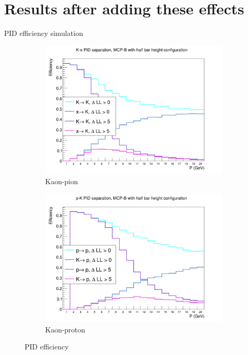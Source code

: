 \documentclass{beamer}
\begin{document}
\section{Results after adding these effects}
\begin{frame}{PID efficiency simulation}
  \begin{figure}
    \centering
    \vspace{-0.2cm}
    \begin{subfigure}{0.5\textwidth}
      \includegraphics[width = 1.0\textwidth]{Plots/KaonPionPIDEfficiencyMCPB_Backscattering.png}
      \caption{Kaon-pion}
    \end{subfigure}%
    \begin{subfigure}{0.5\textwidth}
      \includegraphics[width = 1.0\textwidth]{Plots/ProtonKaonPIDEfficiencyMCPB_Backscattering.png}
      \caption{Kaon-proton}
    \end{subfigure}
    \caption{PID efficiency}
  \end{figure}
\end{frame}
\end{document}
